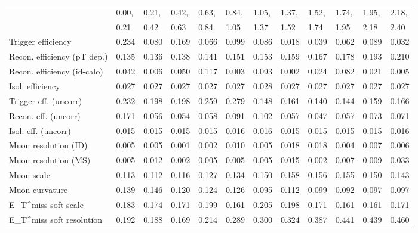 \begin{tabular}{l|p{0.6cm}p{0.6cm}p{0.6cm}p{0.6cm}p{0.6cm}p{0.6cm}p{0.6cm}p{0.6cm}p{0.6cm}p{0.6cm}p{0.6cm}}
\hline
   & 0.00, & 0.21, & 0.42, & 0.63, & 0.84, & 1.05, & 1.37, & 1.52, & 1.74, & 1.95, & 2.18,  \\ 
   & 0.21 & 0.42 & 0.63 & 0.84 & 1.05 & 1.37 & 1.52 & 1.74 & 1.95 & 2.18 & 2.40  \\ 
\hline
Trigger efficiency                       & 0.234 & 0.080 & 0.169 & 0.066 & 0.099 & 0.086 & 0.018 & 0.039 & 0.062 & 0.089 & 0.032 \\
Recon. efficiency (pT dep.)              & 0.135 & 0.136 & 0.138 & 0.141 & 0.151 & 0.153 & 0.159 & 0.167 & 0.178 & 0.193 & 0.210 \\
Recon. efficiency (id-calo)              & 0.042 & 0.006 & 0.050 & 0.117 & 0.003 & 0.093 & 0.002 & 0.024 & 0.082 & 0.021 & 0.005 \\
Isol. efficiency                         & 0.027 & 0.027 & 0.027 & 0.027 & 0.027 & 0.028 & 0.027 & 0.027 & 0.027 & 0.027 & 0.027 \\
Trigger eff. (uncorr)                    & 0.232 & 0.198 & 0.198 & 0.259 & 0.279 & 0.148 & 0.161 & 0.140 & 0.144 & 0.159 & 0.166 \\
Recon. eff. (uncorr)                     & 0.171 & 0.056 & 0.054 & 0.058 & 0.091 & 0.102 & 0.057 & 0.047 & 0.057 & 0.073 & 0.071 \\
Isol. eff. (uncorr)                      & 0.015 & 0.015 & 0.015 & 0.015 & 0.016 & 0.016 & 0.015 & 0.015 & 0.015 & 0.015 & 0.016 \\
Muon resolution (ID)                     & 0.005 & 0.005 & 0.001 & 0.002 & 0.010 & 0.005 & 0.018 & 0.018 & 0.004 & 0.007 & 0.006 \\
Muon resolution (MS)                     & 0.005 & 0.012 & 0.002 & 0.005 & 0.005 & 0.005 & 0.015 & 0.002 & 0.007 & 0.009 & 0.033 \\
Muon scale                               & 0.113 & 0.112 & 0.116 & 0.127 & 0.134 & 0.150 & 0.158 & 0.156 & 0.155 & 0.150 & 0.143 \\
Muon curvature                           & 0.139 & 0.146 & 0.120 & 0.124 & 0.126 & 0.095 & 0.112 & 0.099 & 0.092 & 0.097 & 0.097 \\
E_{T}^{miss} soft scale                  & 0.183 & 0.174 & 0.171 & 0.199 & 0.161 & 0.205 & 0.198 & 0.171 & 0.161 & 0.161 & 0.171 \\
E_{T}^{miss} soft resolution             & 0.192 & 0.188 & 0.169 & 0.214 & 0.289 & 0.300 & 0.324 & 0.387 & 0.441 & 0.439 & 0.460 \\

\end{tabular}
